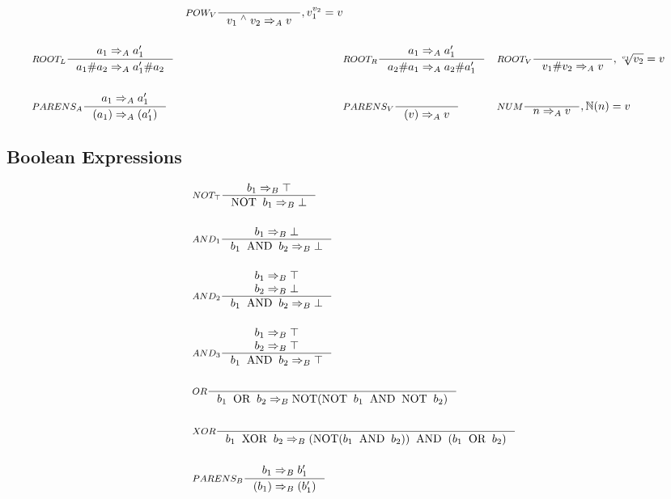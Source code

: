 \begin{align*}
&
&\inference[$POW_V$]{}
                    {v_1 \; ^\wedge{} \; v_2 \Rightarrow_A v}
										{, v_1 ^ {v_2} = v}
\\\\
&\inference[$ROOT_L$]{a_1  \Rightarrow_A a_1'}
                    {a_1 \# a_2 \Rightarrow_A a_1' \# a_2}
&
&\inference[$ROOT_R$]{a_1 \Rightarrow_A a_1'}
                    {a_2 \# a_1 \Rightarrow_A a_2 \# a_1'}
&
&\inference[$ROOT_V$]{}
                    {v_1 \# v_2 \Rightarrow_A v}
										{, \sqrt[v_1]{v_2} = v}
\\\\
&\inference[$PARENS_A$]{a_1 \Rightarrow_A a_1'}
                       {(a_1) \Rightarrow_A (a_1')}
&
&\inference[$PARENS_V$]{}
                       {(v) \Rightarrow_A v}
&
&\inference[$NUM$]{}
                  {n \Rightarrow_A v}
									{, \mathbb{N}(n) = v}
\end{align*}

\subsection{Boolean Expressions}
\begin{align*}
&\inference[$NOT_\top$]{b_1 \Rightarrow_B \top}
                       {\textrm{NOT} \;\; b_1 \Rightarrow_B \bot}
\\\\
&\inference[$AND_1$]{b_1 \Rightarrow_B \bot}
                    {b_1 \;\; \textrm{AND} \;\; b_2 \Rightarrow_B \bot}
\\\\
&\inference[$AND_2$]{b_1 \Rightarrow_B \top \\ b_2 \Rightarrow_B \bot}
								    {b_1 \;\; \textrm{AND} \;\; b_2 \Rightarrow_B \bot}
\\\\
&\inference[$AND_3$]{b_1 \Rightarrow_B \top \\ b_2 \Rightarrow_B \top}
								    {b_1 \;\; \textrm{AND} \;\; b_2 \Rightarrow_B \top}
\\\\
&\inference[$OR$]{}
                 {b_1 \;\; \textrm{OR} \;\; b_2 \Rightarrow_B \textrm{NOT}(\textrm{NOT} \;\; b_1 \;\; \textrm{AND} \;\; \textrm{NOT} \;\; b_2)}
\\\\
&\inference[$XOR$]{}
                  {b_1 \;\; \textrm{XOR} \;\; b_2 \Rightarrow_B (\textrm{NOT}(b_1 \;\; \textrm{AND} \;\; b_2)) \;\; \textrm{AND} \;\; (b_1 \;\; \textrm{OR} \;\; b_2)}
\\\\
&\inference[$PARENS_B$]{b_1 \Rightarrow_B b_1'}
                       {(b_1) \Rightarrow_B (b_1')}
\end{align*}

